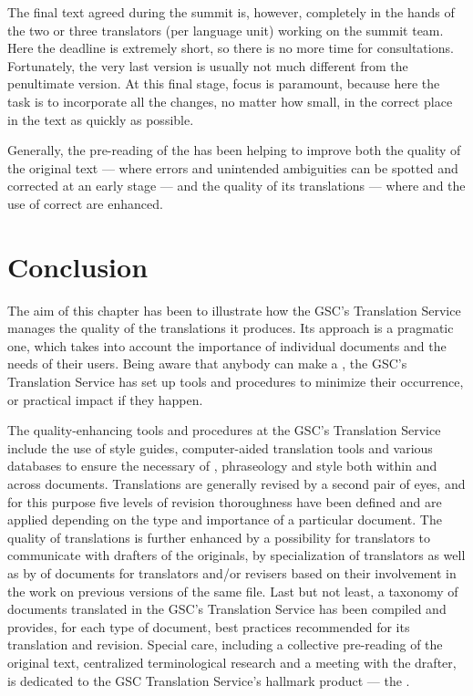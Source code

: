 \documentclass[output=paper]{langsci/langscibook}
\begin{document}
The final text agreed during the summit is, however, completely in the hands of the two or three translators (per language unit) working on the summit team. Here the deadline is extremely short, so there is no more time for consultations. Fortunately, the very last version is usually not much different from the penultimate version. At this final stage, focus is paramount, because here the task is to incorporate all the changes, no matter how small, in the correct place in the text as quickly as possible.

Generally, the pre-reading of the  has been helping to improve both the quality of the original text — where errors and unintended ambiguities can be spotted and corrected at an early stage — and the quality of its translations — where  and the use of correct  are enhanced. 

\section{Conclusion}\label{sec:hanzl:hanzl:7}

The aim of this chapter has been to illustrate how the GSC’s Translation Service manages the quality of the translations it produces. Its approach is a pragmatic one, which takes into account the importance of individual documents and the needs of their users. Being aware that anybody can make a , the GSC’s Translation Service has set up tools and procedures to minimize their occurrence, or practical impact if they happen.

The quality-enhancing tools and procedures at the GSC’s Translation Service include the use of style guides, computer-aided translation tools and various databases to ensure the necessary  of , phraseology and style both within and across documents. Translations are generally revised by a second pair of eyes, and for this purpose five levels of revision thoroughness have been defined and are applied depending on the type and importance of a particular document. The quality of translations is further enhanced by a possibility for translators to communicate with drafters of the originals, by specialization of translators as well as by  of documents for translators and/or revisers based on their involvement in the work on previous versions of the same file. Last but not least, a taxonomy of documents translated in the GSC’s Translation Service has been compiled and provides, for each type of document, best practices recommended for its translation and revision. Special care, including a collective pre-reading of the original text, centralized terminological research and a meeting with the drafter, is dedicated to the GSC Translation Service’s hallmark product — the .
\end{document}
